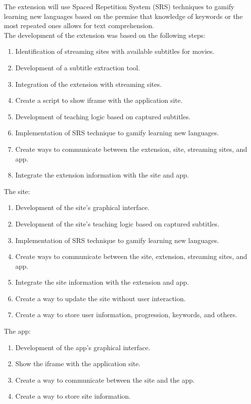 \documentclass[12pt]{article}
\begin{document}
The extension will use Spaced Repetition System (SRS) techniques to gamify learning new languages based on the premise that knowledge of keywords or the most repeated ones allows for text comprehension. \\
The development of the extension was based on the following steps: 
\begin{enumerate}
\item Identification of streaming sites with available subtitles for movies.
\item Development of a subtitle extraction tool.
\item Integration of the extension with streaming sites.
\item Create a script to show iframe with the application site.
\item Development of teaching logic based on captured subtitles.
\item Implementation of SRS technique to gamify learning new languages.
\item Create ways to communicate between the extension, site, streaming sites, and app.
\item Integrate the extension information with the site and app.
\end{enumerate}
The site: 

\begin{enumerate}
\item Development of the site's graphical interface.
\item Development of the site's teaching logic based on captured subtitles.
\item Implementation of SRS technique to gamify learning new languages.
\item Create ways to communicate between the site, extension, streaming sites, and app.
\item Integrate the site information with the extension and app.
\item Create a way to update the site without user interaction.
\item Create a way to store user information, progression, keywords, and others.
\end{enumerate}
The app:

\begin{enumerate}
\item Development of the app's graphical interface.
\item Show the iframe with the application site.
\item Create a way to communicate between the site and the app.
\item Create a way to store site information.
\end{enumerate}
\end{document}
